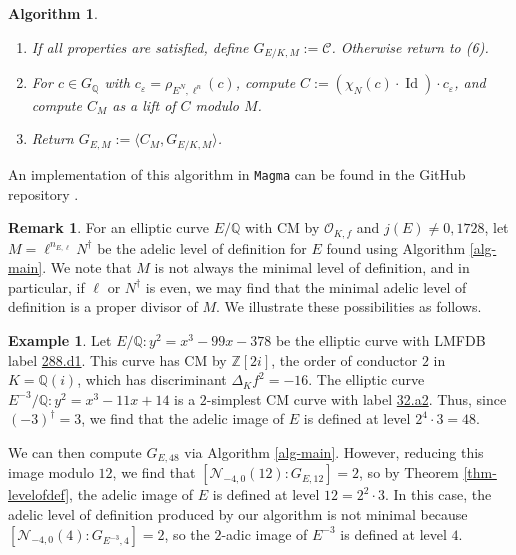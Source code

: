 \documentclass[11pt]{amsart}
\newtheorem{algorithm}[defn]{Algorithm}
\theoremstyle{definition}
\newtheorem{remark}[defn]{Remark}
\newtheorem{example}[defn]{Example}
\newcommand{\Q}{\mathbb{Q}}
\newcommand{\Z}{\mathbb{Z}}
\newcommand{\Of}{\mathcal{O}_{K,f}}
\newcommand{\cC}{\mathcal{C}}
\DeclareMathOperator{\Id}{Id}  %
\begin{document}
\begin{algorithm}
\begin{enumerate}
\begin{enumerate}
            \item Check if $\mathcal{C} \cap (H_{\ell^n}\times \mathcal{C}_{\delta, \phi}(N^\dagger)) = \cC \cap (\mathcal{C}_{\delta, \phi}(\ell^n) \times H_{N^\dagger})$.
        \end{enumerate}
        \item If all properties are satisfied, define $G_{E/K, M} := \mathcal{C}$. Otherwise return to (6).
        \item For $c \in G_{\Q}$ with $c_{\varepsilon} = \rho_{E^N, \ell^n}(c)$, compute $C := (\chi_{N}(c) \cdot \Id) \cdot c_{\varepsilon}$, and compute $C_M$ as a lift of $C$ modulo $M$.
        \item Return $G_{E, M} := \langle C_M, G_{E/K, M} \rangle$. 
    \end{enumerate}
\end{algorithm}

An implementation of this algorithm in \texttt{Magma} can be found in the GitHub repository \cite{githubrepo}.

\begin{remark}
    For an elliptic curve $E/\Q$ with CM by $\Of$ and $j(E) \neq 0, 1728$, let $M = \ell^{n_{E, \ell}} N^{\dagger}$ be the adelic level of definition for $E$ found using Algorithm \ref{alg-main}. We note that $M$ is not always the minimal level of definition, and in particular, if $\ell$ or $N^{\dagger}$ is even, we may find that the minimal adelic level of definition is a proper divisor of $M$. We illustrate these possibilities as follows.
\end{remark}


\begin{example}
    Let $E/\Q : y^2 = x^3-99x-378$ be the elliptic curve with LMFDB label \href{https://www.lmfdb.org/EllipticCurve/Q/288/d/1}{288.d1}. This curve has CM by $\Z[2i]$, the order of conductor $2$ in $K = \Q(i)$, which has discriminant $\Delta_K f^2 = -16$. The elliptic curve $E^{-3}/\Q : y^2=x^3-11x+14$ is a $2$-simplest CM curve with label \href{https://www.lmfdb.org/EllipticCurve/Q/32/a/2}{32.a2}. Thus,  since $(-3)^{\dagger} = 3$, we find that the adelic image of $E$ is defined at level $2^4 \cdot 3 = 48$.

    We can then compute $G_{E, 48}$ via Algorithm \ref{alg-main}. However, reducing this image modulo $12$, we find that $[\mathcal{N}_{-4, 0}(12) : G_{E, 12}] = 2$, so by Theorem \ref{thm-levelofdef}, the adelic image of $E$ is defined at level $12 = 2^2 \cdot 3$. In this case, the adelic level of definition produced by our algorithm is not minimal because $[\mathcal{N}_{-4, 0}(4) : G_{E^{-3}, 4}] = 2$, so the $2$-adic image of $E^{-3}$ is defined at level $4$.
\end{example}
\end{document}
